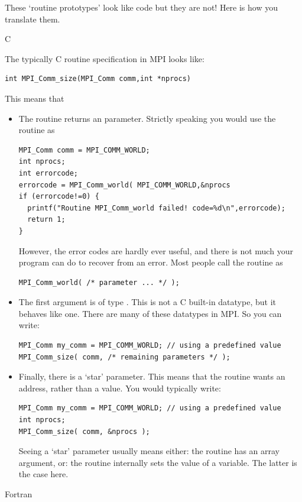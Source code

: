 These `routine prototypes' look like code but they are not! Here is
how you translate them.

 {C}

The typically C routine specification in MPI looks like:
\begin{verbatim}
int MPI_Comm_size(MPI_Comm comm,int *nprocs)
\end{verbatim}
This means that
\begin{itemize}
\item The routine returns an  parameter. Strictly speaking you
  would use the routine as
\begin{verbatim}
MPI_Comm comm = MPI_COMM_WORLD;
int nprocs;
int errorcode;
errorcode = MPI_Comm_world( MPI_COMM_WORLD,&nprocs
if (errorcode!=0) {
  printf("Routine MPI_Comm_world failed! code=%d\n",errorcode);
  return 1;
}
\end{verbatim}
  However, the error codes are hardly ever useful, and there is not
  much your program can do to recover from an error. Most people call
  the routine as
\begin{verbatim}
MPI_Comm_world( /* parameter ... */ );
\end{verbatim}
\item The first argument is of type . This is not a C
  built-in datatype, but it behaves like one. There are many of these
   datatypes in MPI. So you can write:
\begin{verbatim}
MPI_Comm my_comm = MPI_COMM_WORLD; // using a predefined value
MPI_Comm_size( comm, /* remaining parameters */ );
\end{verbatim}
\item Finally, there is a `star' parameter. This means that the
  routine wants an address, rather than a value. You would typically write:
\begin{verbatim}
MPI_Comm my_comm = MPI_COMM_WORLD; // using a predefined value
int nprocs;
MPI_Comm_size( comm, &nprocs );
\end{verbatim}
  Seeing a `star' parameter usually means either: the routine has an
  array argument, or: the routine internally sets the value of a
  variable. The latter is the case here.
\end{itemize}

 {Fortran}

